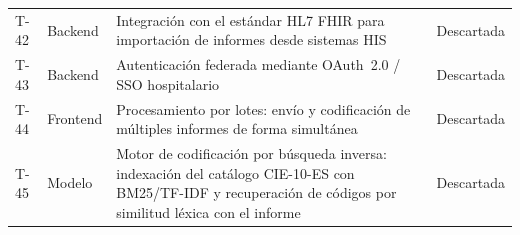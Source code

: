 \begin{center}
\begin{longtable}{llp{7cm}c}
T-42 & Backend & Integración con el estándar HL7 FHIR para importación de informes desde sistemas HIS & Descartada \\
T-43 & Backend & Autenticación federada mediante OAuth~2.0 / SSO hospitalario & Descartada \\
T-44 & Frontend & Procesamiento por lotes: envío y codificación de múltiples informes de forma simultánea & Descartada \\
T-45 & Modelo & Motor de codificación por búsqueda inversa: indexación del catálogo CIE-10-ES con BM25/TF-IDF y recuperación de códigos por similitud léxica con el informe & Descartada \\
\hline
\end{longtable}
\end{center}
